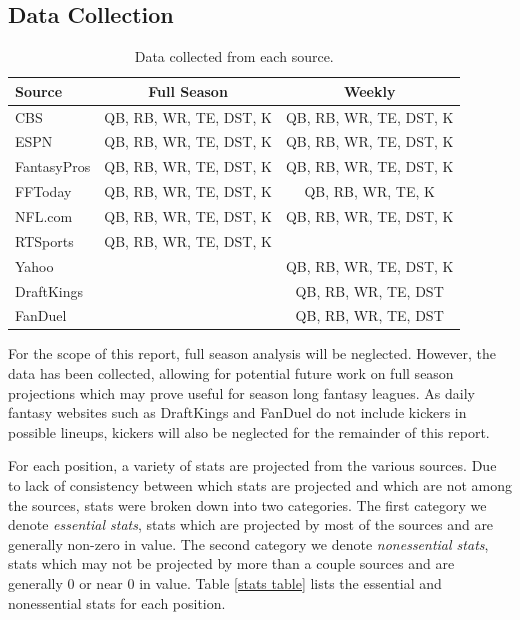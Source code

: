 \documentclass[12pt]{article}
\begin{document}
\subsection{Data Collection}
\begin{table}[H]
\caption{Data collected from each source.}
\small
\label{sources}
\centering
\begin{tabular}{lcc}
	\toprule
	Source        &  Full Season              &  Weekly \\
	\midrule
	CBS           &  QB, RB, WR, TE, DST, K   &   QB, RB, WR, TE, DST, K \\
	ESPN          &  QB, RB, WR, TE, DST, K   &   QB, RB, WR, TE, DST, K \\
	FantasyPros   &  QB, RB, WR, TE, DST, K   &   QB, RB, WR, TE, DST, K \\
	FFToday       &  QB, RB, WR, TE, DST, K   &   QB, RB, WR, TE, K \\
	NFL.com       &  QB, RB, WR, TE, DST, K   &   QB, RB, WR, TE, DST, K \\
	RTSports      &  QB, RB, WR, TE, DST, K   &    {} \\
	Yahoo         &  {}                       &   QB, RB, WR, TE, DST, K \\
	\midrule
	DraftKings    &  {}                       &   QB, RB, WR, TE, DST \\
 	FanDuel       &  {}                       &   QB, RB, WR, TE, DST \\
	\bottomrule
\end{tabular}
\end{table}

For the scope of this report, full season analysis will be neglected. However, the data has been collected, allowing for potential future work on full season projections which may prove useful for season long fantasy leagues. As daily fantasy websites such as DraftKings and FanDuel do not include kickers in possible lineups, kickers will also be neglected for the remainder of this report.\bigskip

For each position, a variety of stats are projected from the various sources. Due to lack of consistency between which stats are projected and which are not among the sources, stats were broken down into two categories. The first category we denote \textit{essential stats}, stats which are projected by most of the sources and are generally non-zero in value. The second category we denote \textit{nonessential stats}, stats which may not be projected by more than a couple sources and are generally 0 or near 0 in value. Table \ref{stats table} lists the essential and nonessential stats for each position.
\end{document}
